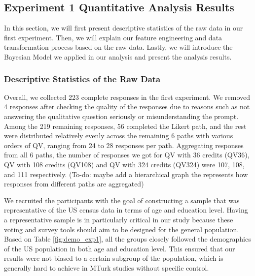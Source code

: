 \subsection{Experiment 1 Quantitative Analysis Results} \label{results-1-quan}
In this section, we will first present descriptive statistics of the raw data in our first experiment. Then, we will explain our feature engineering and data transformation process based on the raw data. Lastly, we will introduce the Bayesian Model we applied in our analysis and present the analysis results.

\subsubsection{Descriptive Statistics of the Raw Data}
    
Overall, we collected 223 complete responses in the first experiment. We removed 4 responses after checking the quality of the responses due to reasons such as not answering the qualitative question seriously or misunderstanding the prompt. Among the 219 remaining responses, 56 completed the Likert path, and the rest were distributed relatively evenly across the remaining 6 paths with various orders of QV, ranging from 24 to 28 responses per path. Aggregating responses from all 6 paths, the number of responses we got for QV with 36 credits (QV36), QV with 108 credits (QV108) and QV with 324 credits (QV324) were 107, 108, and 111 respectively. (To-do: maybe add a hierarchical graph the represents how responses from different paths are aggregated)

We recruited the participants with the goal of constructing a sample that was representative of the US census data in terms of age and education level. Having a representative sample is in particularly critical in our study because these voting and survey tools should aim to be designed for the general population. Based on Table \ref{fig:demo_exp1}, all the groups closely followed the demographics of the US population in both age and education level. This ensured that our results were not biased to a certain subgroup of the population, which is generally hard to achieve in MTurk studies without specific control. 

